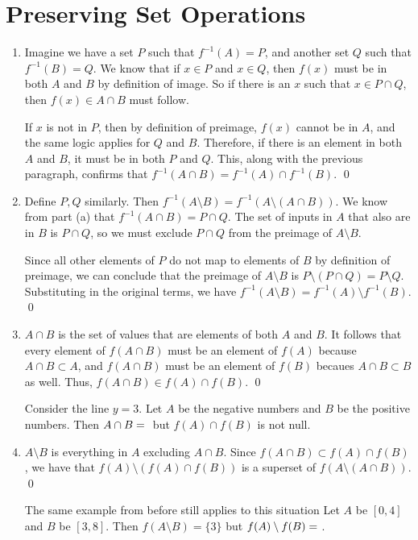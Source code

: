 \documentclass{article}
\begin{document}
\section{Preserving Set Operations}
\begin{enumerate}[label=\alph*.]
	\item Imagine we have a set $P$ such that $f^{-1}(A) = P$, and 
	another set $Q$ such that $f^{-1}(B) = Q$. We know that if $x \in P$
	and $x \in Q$, then $f(x)$ must be in both $A$ and $B$ by definition of image.
	So if there is an $x$ such that $x \in P \cap Q$, then $f(x) \in A \cap B$ must 
	follow.

	If $x$ is not in $P$, then by definition of preimage, $f(x)$ cannot be in $A$,
	and the same logic applies for $Q$ and $B$. Therefore, if there is an element 
	in both $A$ and $B$, it must be in both $P$ and $Q$. This, along with the previous 
	paragraph, confirms that $f^{-1}(A \cap B) = f^{-1}(A) \cap f^{-1}(B)$. \qed 
	\item Define $P, Q$ similarly. Then $f^{-1}(A \setminus B) = f^{-1}(A \setminus (A \cap B)).$
	We know from part (a) that $f^{-1}(A \cap B) = P \cap Q$. The set of inputs in $A$ that also 
	are in $B$ is $P \cap Q$, so we must exclude $P \cap Q$ from the preimage of $A \setminus B$.

	Since all other elements of $P$ do not map to elements of $B$ by definition of preimage, 
	we can conclude that the preimage of $A \setminus B$ is $P \setminus (P \cap Q) = P \setminus Q$.
	Substituting in the original terms, we have $f^{-1}(A \setminus B) = f^{-1}(A) \setminus f^{-1}(B)$.
	\qed
	\item $A \cap B$ is the set of values that are elements of both $A$ and $B$. It follows 
	that every element of $f(A \cap B)$ must be an element of $f(A)$ because $A \cap B \subset A$,
	and $f(A \cap B)$ must be an element of $f(B)$ becaues $A \cap B \subset B$ as well. Thus,
	$f(A \cap B) \in f(A) \cap f(B)$. \qed

	Consider the line $y=3$. Let $A$ be the negative numbers and $B$ be the positive numbers. Then 
	$A \cap B = \null$ but $f(A) \cap f(B)$ is not null.
	\item $A \setminus B$ is everything in $A$ excluding $A \cap B$. Since $f(A \cap B) \subset 
	f(A) \cap f(B)$, we have that $f(A) \setminus (f(A) \cap f(B))$ is a superset of $f(A \setminus 
	(A \cap B))$. \qed
	
	The same example from before still applies to this situation Let $A$ be $[0, 4]$ and $B$ be 
	$[3, 8]$. Then $f(A \setminus B) = \{3\}$ but $f(A) \setminus f(B) = \null$.
\end{enumerate}
\end{document}
